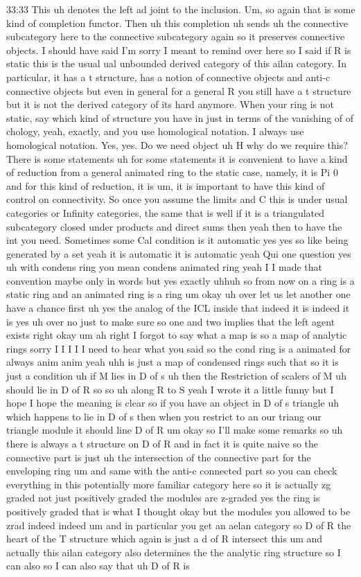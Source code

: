 \begin{unfinished}{33:33}
This uh denotes the left ad joint to the inclusion. Um, so again that is some kind of completion functor. Then uh this completion uh sends uh the connective subcategory here to the connective subcategory again so it preserves connective objects. I should have said I'm sorry I meant to remind over here so I said if R is static this is the usual ual unbounded derived category of this ailan category. In particular, it has a t structure, has a notion of connective objects and anti-c connective objects but even in general for a general R you still have a t structure but it is not the derived category of its hard anymore. When your ring is not static, say which kind of structure you have in just in terms of the vanishing of of chology, yeah, exactly, and you use homological notation. I always use homological notation. Yes, yes. Do we need object uh H why do we require this? There is  some statements uh for some statements it is convenient to have a kind of reduction from a general animated ring to the static case, namely, it is Pi 0 and for this kind of reduction, it is um, it is important to have this kind of control on connectivity. So once you assume the limits and C this is under usual categories or Infinity categories, the same that is well if it is a triangulated subcategory closed under products and direct sums then yeah then to have the int you need. Sometimes some Cal condition is it automatic yes yes so like being generated by a set yeah it is automatic it is automatic yeah Qui one question yes uh with condens ring you mean condens animated ring yeah I I made that convention maybe only in words but yes exactly uhhuh so from now on a ring is a static ring and an animated ring is a ring um okay uh over let us let another one have a chance first uh yes the analog of the ICL inside that indeed it is indeed it is yes uh over no just to make sure so one and two implies that the left agent exists right okay um ah right I forgot to say what a map is so a map of analytic rings sorry I I I I I need to hear what you said so the cond ring is a animated for always anim anim yeah uhh is just a map of condensed rings such that so it is just a condition uh if M lies in D of s uh then the Restriction of scalers of M uh should lie in D of R so so uh along R to S yeah I wrote it a little funny but I hope I hope the meaning is clear so if you have an object in D of s triangle uh which happens to lie in D of s then when you restrict to an our triang our triangle module it should line D of R um okay so I'll make some remarks so uh there is always a t structure on D of R and in fact it is quite naive so the connective part is just uh the intersection of the connective part for the enveloping ring um and same with the anti-c connected part so you can check everything in this potentially more familiar category here so it is actually zg graded not just positively graded the modules are z-graded yes the ring is positively graded that is what I thought okay but the modules you allowed to be zrad indeed indeed um and in particular you get an aelan category so D of R the heart of the T structure which again is just a d of R intersect this um and actually this ailan category also determines the the analytic ring structure so I can also so I can also say that uh D of R is 
\end{unfinished}
